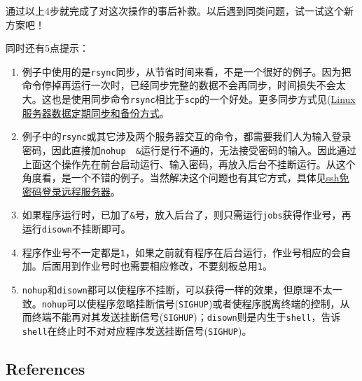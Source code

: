 \documentclass[]{article}
\providecommand{\tightlist}{%
  \setlength{\itemsep}{0pt}\setlength{\parskip}{0pt}}
\numberwithin{figure}{section}
\numberwithin{table}{section}
\begin{document}
通过以上4步就完成了对这次操作的事后补救。以后遇到同类问题，试一试这个新方案吧！

同时还有5点提示：

\begin{enumerate}
\def\labelenumi{\arabic{enumi}.}
\tightlist
\item
  例子中使用的是\texttt{rsync}同步，从节省时间来看，不是一个很好的例子。因为把命令停掉再运行一次时，已经同步完整的数据不会再同步，时间损失不会太大。这也是使用同步命令\texttt{rsync}相比于\texttt{scp}的一个好处。更多同步方式见(\href{https://mp.weixin.qq.com/s/c2cspK5b4sQScWYMBtG63g}{Linux服务器数据定期同步和备份方式}。
\item
  例子中的\texttt{rsync}或其它涉及两个服务器交互的命令，都需要我们人为输入登录密码，因此直接加\texttt{nohup\ \ \&}运行是行不通的，无法接受密码的输入。因此通过上面这个操作先在前台启动运行、输入密码，再放入后台不挂断运行。从这个角度看，是一个不错的例子。当然解决这个问题也有其它方式，具体见\href{https://mp.weixin.qq.com/s/wTM8J9zVEdl1PcGpJQbeEw}{ssh免密码登录远程服务器}。
\item
  如果程序运行时，已加了\texttt{\&}号，放入后台了，则只需运行\texttt{jobs}获得作业号，再运行\texttt{disown}不挂断即可。
\item
  程序作业号不一定都是\texttt{1}，如果之前就有程序在后台运行，作业号相应的会自加。后面用到作业号时也需要相应修改，不要刻板总用\texttt{1}。
\item
  \texttt{nohup}和\texttt{disown}都可以使程序不挂断，可以获得一样的效果，但原理不太一致。\texttt{nohup}可以使程序忽略挂断信号(\texttt{SIGHUP})或者使程序脱离终端的控制，从而终端不能再对其发送挂断信号(\texttt{SIGHUP})；\texttt{disown}则是内生于\texttt{shell}，告诉\texttt{shell}在终止时不对对应程序发送挂断信号(\texttt{SIGHUP})。
\end{enumerate}

\hypertarget{references}{%
\subsection{References}\label{references}}
\end{document}
